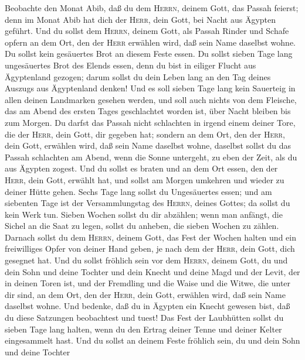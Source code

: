  Beobachte den Monat Abib, daß du dem \textsc{Herrn},
deinem Gott, das Passah feierst; denn im Monat Abib hat dich der
\textsc{Herr}, dein Gott, bei Nacht aus Ägypten geführt. 
Und du sollst dem \textsc{Herrn}, deinem Gott, als Passah Rinder und
Schafe opfern an dem Ort, den der \textsc{Herr} erwählen wird, daß sein
Name daselbst wohne.  Du sollst kein gesäuertes Brot an
diesem Feste essen. Du sollst sieben Tage lang ungesäuertes Brot des
Elends essen, denn du bist in eiliger Flucht aus Ägyptenland gezogen;
darum sollst du dein Leben lang an den Tag deines Auszugs aus
Ägyptenland denken!  Und es soll sieben Tage lang kein
Sauerteig in allen deinen Landmarken gesehen werden, und soll auch
nichts von dem Fleische, das am Abend des ersten Tages geschlachtet
worden ist, über Nacht bleiben bis zum Morgen.  Du darfst
das Passah nicht schlachten in irgend einem deiner Tore, die der
\textsc{Herr}, dein Gott, dir gegeben hat;  sondern an dem
Ort, den der \textsc{Herr}, dein Gott, erwählen wird, daß sein Name
daselbst wohne, daselbst sollst du das Passah schlachten am Abend, wenn
die Sonne untergeht, zu eben der Zeit, als du aus Ägypten zogest.
 Und du sollst es braten und an dem Ort essen, den der
\textsc{Herr}, dein Gott, erwählt hat, und sollst am Morgen umkehren und
wieder zu deiner Hütte gehen.  Sechs Tage lang sollst du
Ungesäuertes essen; und am siebenten Tage ist der Versammlungstag des
\textsc{Herrn}, deines Gottes; da sollst du kein Werk tun.
 Sieben Wochen sollst du dir abzählen; wenn man anfängt,
die Sichel an die Saat zu legen, sollst du anheben, die sieben Wochen zu
zählen.  Darnach sollst du dem \textsc{Herrn}, deinem
Gott, das Fest der Wochen halten und ein freiwilliges Opfer von deiner
Hand geben, je nach dem der \textsc{Herr}, dein Gott, dich gesegnet hat.
 Und du sollst fröhlich sein vor dem \textsc{Herrn},
deinem Gott, du und dein Sohn und deine Tochter und dein Knecht und
deine Magd und der Levit, der in deinen Toren ist, und der Fremdling und
die Waise und die Witwe, die unter dir sind, an dem Ort, den der
\textsc{Herr}, dein Gott, erwählen wird, daß sein Name daselbst wohne.
 Und bedenke, daß du in Ägypten ein Knecht gewesen bist,
daß du diese Satzungen beobachtest und tuest!  Das Fest
der Laubhütten sollst du sieben Tage lang halten, wenn du den Ertrag
deiner Tenne und deiner Kelter eingesammelt hast.  Und du
sollst an deinem Feste fröhlich sein, du und dein Sohn und deine Tochter
